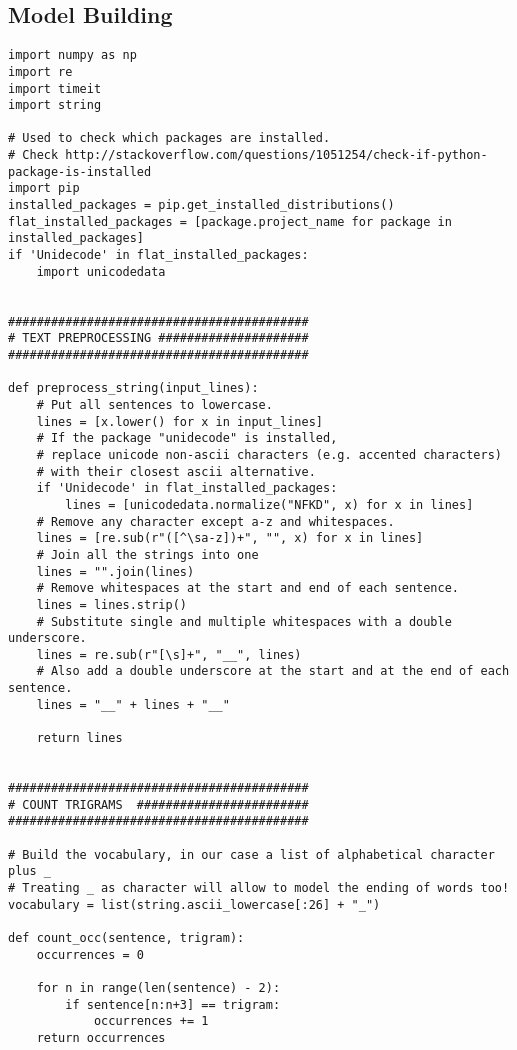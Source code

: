 \documentclass[
12pt,
a4paper,
oneside,
headinclude,
footinclude]{article}
\theoremstyle{definition} %
\begin{document}
\subsection{Model Building}
    
\begin{verbatim}
import numpy as np
import re
import timeit
import string

# Used to check which packages are installed.
# Check http://stackoverflow.com/questions/1051254/check-if-python-package-is-installed
import pip
installed_packages = pip.get_installed_distributions()
flat_installed_packages = [package.project_name for package in installed_packages]
if 'Unidecode' in flat_installed_packages:
    import unicodedata


##########################################
# TEXT PREPROCESSING #####################
##########################################

def preprocess_string(input_lines):
    # Put all sentences to lowercase.
    lines = [x.lower() for x in input_lines]
    # If the package "unidecode" is installed,
    # replace unicode non-ascii characters (e.g. accented characters) 
    # with their closest ascii alternative.
    if 'Unidecode' in flat_installed_packages:
        lines = [unicodedata.normalize("NFKD", x) for x in lines]
    # Remove any character except a-z and whitespaces.
    lines = [re.sub(r"([^\sa-z])+", "", x) for x in lines]
    # Join all the strings into one
    lines = "".join(lines)
    # Remove whitespaces at the start and end of each sentence.
    lines = lines.strip()
    # Substitute single and multiple whitespaces with a double underscore.
    lines = re.sub(r"[\s]+", "__", lines)
    # Also add a double underscore at the start and at the end of each sentence.
    lines = "__" + lines + "__"
    
    return lines


##########################################
# COUNT TRIGRAMS  ########################
##########################################

# Build the vocabulary, in our case a list of alphabetical character plus _
# Treating _ as character will allow to model the ending of words too!
vocabulary = list(string.ascii_lowercase[:26] + "_")

def count_occ(sentence, trigram):
    occurrences = 0

    for n in range(len(sentence) - 2):
        if sentence[n:n+3] == trigram:
            occurrences += 1
    return occurrences


\end{verbatim}
\end{document}

